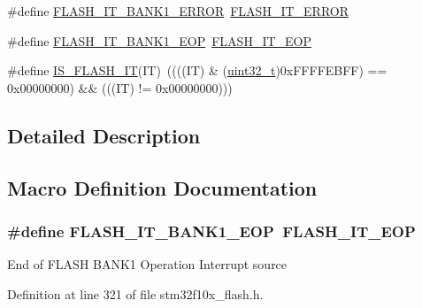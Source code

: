\begin{DoxyCompactItemize}
\item 
\#define \hyperlink{group___f_l_a_s_h___interrupts_ga808627239be1bf9c2d8bfed36ec4db19}{F\+L\+A\+S\+H\+\_\+\+I\+T\+\_\+\+B\+A\+N\+K1\+\_\+\+E\+R\+R\+OR}~\hyperlink{group___f_l_a_s_h___interrupts_ga61c74493d4c1f36ddaf563719d446a7d}{F\+L\+A\+S\+H\+\_\+\+I\+T\+\_\+\+E\+R\+R\+OR}
\item 
\#define \hyperlink{group___f_l_a_s_h___interrupts_gac8825e2ce2c0e6ca63a40a347bd351a9}{F\+L\+A\+S\+H\+\_\+\+I\+T\+\_\+\+B\+A\+N\+K1\+\_\+\+E\+OP}~\hyperlink{group___f_l_a_s_h___interrupts_gaea20e80e1806d58a7544cfe8659e7f11}{F\+L\+A\+S\+H\+\_\+\+I\+T\+\_\+\+E\+OP}
\item 
\#define \hyperlink{group___f_l_a_s_h___interrupts_ga46ee77d0be1f3e0a14ded0651163ae11}{I\+S\+\_\+\+F\+L\+A\+S\+H\+\_\+\+IT}(IT)~((((IT) \& (\hyperlink{_p_e___types_8h_a33594304e786b158f3fb30289278f5af}{uint32\+\_\+t})0x\+F\+F\+F\+F\+E\+B\+F\+F) == 0x00000000) \&\& (((\+I\+T) != 0x00000000)))
\end{DoxyCompactItemize}


\subsection{Detailed Description}


\subsection{Macro Definition Documentation}
\subsubsection[{\texorpdfstring{F\+L\+A\+S\+H\+\_\+\+I\+T\+\_\+\+B\+A\+N\+K1\+\_\+\+E\+OP}{FLASH_IT_BANK1_EOP}}]{\setlength{\rightskip}{0pt plus 5cm}\#define F\+L\+A\+S\+H\+\_\+\+I\+T\+\_\+\+B\+A\+N\+K1\+\_\+\+E\+OP~{\bf F\+L\+A\+S\+H\+\_\+\+I\+T\+\_\+\+E\+OP}}\hypertarget{group___f_l_a_s_h___interrupts_gac8825e2ce2c0e6ca63a40a347bd351a9}{}\label{group___f_l_a_s_h___interrupts_gac8825e2ce2c0e6ca63a40a347bd351a9}
End of F\+L\+A\+SH B\+A\+N\+K1 Operation Interrupt source 

Definition at line 321 of file stm32f10x\+\_\+flash.\+h.

